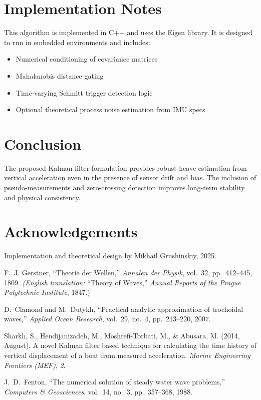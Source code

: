 \documentclass[11pt,letterpaper]{article}
\begin{document}
\section{Implementation Notes}

This algorithm is implemented in C++ and uses the Eigen library. It is designed to run in embedded environments and includes:
\begin{itemize}
  \item Numerical conditioning of covariance matrices
  \item Mahalanobis distance gating
  \item Time-varying Schmitt trigger detection logic
  \item Optional theoretical process noise estimation from IMU specs
\end{itemize}

\section{Conclusion}
The proposed Kalman filter formulation provides robust heave estimation from vertical acceleration even in the presence of sensor drift and bias. The inclusion of pseudo-measurements and zero-crossing detection improves long-term stability and physical consistency.

\section*{Acknowledgements}
Implementation and theoretical design by Mikhail Grushinskiy, 2025.

\begin{thebibliography}{4}

F.~J. Gerstner, ``Theorie der Wellen,'' 
\emph{Annalen der Physik}, vol.~32, pp.~412–445, 1809.  
\emph{(English translation: }``Theory of Waves,'' \emph{Annual Reports of the Prague Polytechnic Institute}, 1847.)

D.~Clamond and M.~Dutykh, ``Practical analytic approximation of trochoidal waves,'' 
\emph{Applied Ocean Research}, vol.~29, no.~4, pp.~213–220, 2007.

Sharkh, S., Hendijanizadeh, M., Moshrefi-Torbati, M., \& Abusara, M. (2014, August). 
A novel Kalman filter based technique for calculating the time history of vertical displacement of a boat from measured acceleration. 
\textit{Marine Engineering Frontiers (MEF)}, \textit{2}.

J.~D.~Fenton, “The numerical solution of steady water wave problems,” \emph{Computers \& Geosciences}, vol.~14, no.~3, pp.~357–368, 1988.

\end{thebibliography}
\end{document}
